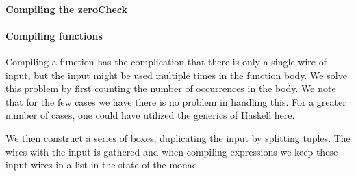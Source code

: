 \paragraph{Compiling the zeroCheck}
\label{sec:compiling-zerochk}


\paragraph{Compiling functions}
\label{sec:compiling-functions}

Compiling a function has the complication that there is only a single
wire of input, but the input might be used multiple times in the
function body. We solve this problem by first counting the number of
occurrences in the body. We note that for the few cases we have there
is no problem in handling this. For a greater number of cases, one could
have utilized the generics of Haskell here.

We then construct a series of boxes, duplicating the input by
splitting tuples. The wires with the input is gathered and when
compiling expressions we keep these input wires in a list in the state
of the monad.


